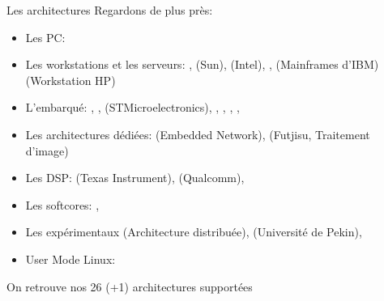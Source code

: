\begin{frame}[fragile=singleslide]{Les architectures}
  Regardons  de plus près:
  \begin{itemize} 
  \item Les PC: 
  \item Les  workstations et les  serveurs: , 
    (Sun),        (Intel),   ,    
    (Mainframes d'IBM)  (Workstation HP)
  \item     L'embarqué:     ,     ,     
    (STMicroelectronics),   ,  ,  ,
    ,  
  \item  Les architectures  dédiées:   (Embedded  Network),
     (Futjisu, Traitement d'image)
  \item  Les   DSP:    (Texas   Instrument),  
    (Qualcomm), 
  \item Les softcores: , 
  \item  Les   expérimentaux    (Architecture  distribuée),
     (Université de Pekin), 
  \item User Mode Linux: 
  \end{itemize} 
  On retrouve nos 26 (+1) architectures supportées
\end{frame}    

